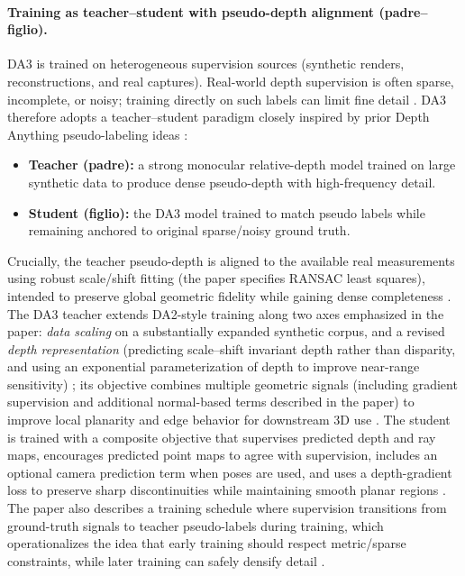 \documentclass{report}
\begin{document}
\paragraph{Training as teacher--student with pseudo-depth alignment (padre--figlio).}
DA3 is trained on heterogeneous supervision sources (synthetic renders, reconstructions, and real captures). Real-world depth supervision is often sparse, incomplete, or noisy; training directly on such labels can limit fine detail \cite{lin2025depthanything3}. DA3 therefore adopts a teacher--student paradigm closely inspired by prior Depth Anything pseudo-labeling ideas \cite{yang2024depth,yang2024depthanythingv2}:
\begin{itemize}
    \item \textbf{Teacher (padre):} a strong monocular relative-depth model trained on large synthetic data to produce dense pseudo-depth with high-frequency detail.
    \item \textbf{Student (figlio):} the DA3 model trained to match pseudo labels while remaining anchored to original sparse/noisy ground truth.
\end{itemize}
Crucially, the teacher pseudo-depth is aligned to the available real measurements using robust scale/shift fitting (the paper specifies RANSAC least squares), intended to preserve global geometric fidelity while gaining dense completeness \cite{lin2025depthanything3}. The DA3 teacher extends DA2-style training along two axes emphasized in the paper: \emph{data scaling} on a substantially expanded synthetic corpus, and a revised \emph{depth representation} (predicting scale--shift invariant depth rather than disparity, and using an exponential parameterization of depth to improve near-range sensitivity) \cite{yang2024depthanythingv2,lin2025depthanything3}; its objective combines multiple geometric signals (including gradient supervision and additional normal-based terms described in the paper) to improve local planarity and edge behavior for downstream 3D use \cite{lin2025depthanything3}. The student is trained with a composite objective that supervises predicted depth and ray maps, encourages predicted point maps to agree with supervision, includes an optional camera prediction term when poses are used, and uses a depth-gradient loss to preserve sharp discontinuities while maintaining smooth planar regions \cite{lin2025depthanything3}. The paper also describes a training schedule where supervision transitions from ground-truth signals to teacher pseudo-labels during training, which operationalizes the idea that early training should respect metric/sparse constraints, while later training can safely densify detail \cite{lin2025depthanything3}.
\end{document}
